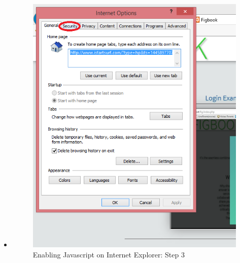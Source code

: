 \begin{itemize}
\item		\begin{figure}[!h]
		\centering
			\includegraphics[scale=0.5]{images/javascriptIE3.png}
			\caption{Enabling Javascript on Internet Explorer: Step 3}
		\end{figure}
		

\end{itemize}
